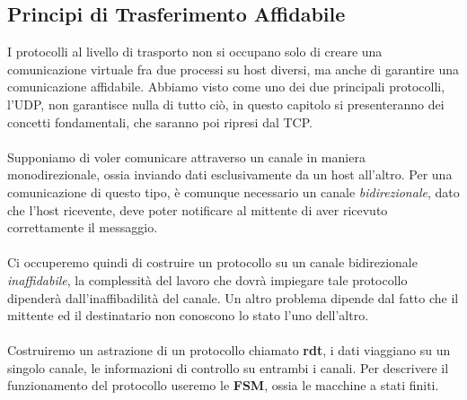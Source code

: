 \documentclass[12pt, letterpaper]{article}
\newcommand{\acc}{\\\hphantom{}\\}
\begin{document}
\subsection{Principi di Trasferimento Affidabile}
I protocolli al livello di trasporto non si occupano solo di creare
una comunicazione virtuale fra due processi su host diversi, ma anche di
garantire una comunicazione affidabile. Abbiamo visto come uno dei due
principali protocolli, l'UDP, non garantisce nulla di tutto ciò, in questo
capitolo si presenteranno dei concetti fondamentali, che saranno poi ripresi
dal TCP.\acc
Supponiamo di voler comunicare attraverso un canale in maniera
monodirezionale, ossia inviando dati esclusivamente da un host
all'altro. Per una comunicazione di questo tipo, è comunque necessario
un canale \textit{bidirezionale}, dato che l'host ricevente,
deve poter notificare al mittente di aver ricevuto correttamente il
messaggio.\acc
Ci occuperemo quindi di costruire un protocollo su un canale bidirezionale
\textit{inaffidabile}, la complessità del lavoro che dovrà impiegare tale
protocollo dipenderà dall'inaffibadilità del canale. Un altro problema
dipende dal fatto che il mittente ed il destinatario non conoscono
lo stato l'uno dell'altro.\acc
Costruiremo un astrazione di un protocollo chiamato
\textbf{rdt}, i dati viaggiano su un singolo canale, le informazioni di
controllo su entrambi i canali. Per descrivere il funzionamento del protocollo
useremo le \textbf{FSM}, ossia le macchine a stati finiti.
\end{document}
